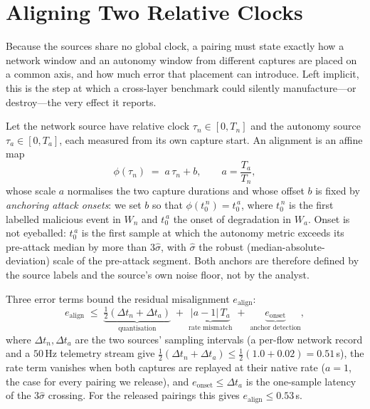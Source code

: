 \section{Aligning Two Relative Clocks}
\label{app:alignment}
Because the sources share no global clock, a  pairing
must state exactly how a network window and an autonomy window from different
captures are placed on a common axis, and how much error that placement can
introduce. Left implicit, this is the step at which a cross-layer benchmark
could silently manufacture---or destroy---the very effect it reports.

Let the network source have relative clock $\tau_n\in[0,T_n]$ and the autonomy
source $\tau_a\in[0,T_a]$, each measured from its own capture start. An
alignment is an affine map
\begin{equation}
\label{eq:align}
\phi(\tau_n) \;=\; a\,\tau_n + b, \qquad a=\frac{T_a}{T_n},
\end{equation}
whose scale $a$ normalises the two capture durations and whose offset $b$ is
fixed by \emph{anchoring attack onsets}: we set $b$ so that
$\phi(t_0^{\,n}) = t_0^{\,a}$, where $t_0^{\,n}$ is the first labelled malicious
event in $W_n$ and $t_0^{\,a}$ the onset of degradation in $W_a$. Onset is not
eyeballed: $t_0^{\,a}$ is the first sample at which the autonomy metric exceeds
its pre-attack median by more than $3\hat\sigma$, with $\hat\sigma$ the robust
(median-absolute-deviation) scale of the pre-attack segment. Both anchors are
therefore defined by the source labels and the source's own noise floor, not by
the analyst.

Three error terms bound the residual misalignment $e_{\mathrm{align}}$:
\begin{equation}
\label{eq:align_err}
e_{\mathrm{align}} \;\le\; \underbrace{\tfrac{1}{2}(\Delta t_n+\Delta t_a)}_{\text{quantisation}}
\;+\;\underbrace{|a-1|\,T_a}_{\text{rate mismatch}}
\;+\;\underbrace{e_{\mathrm{onset}}}_{\text{anchor detection}},
\end{equation}
where $\Delta t_n,\Delta t_a$ are the two sources' sampling intervals (a per-flow
network record and a $50$\,Hz telemetry stream give
$\tfrac12(\Delta t_n+\Delta t_a)\le\tfrac12(1.0+0.02)=0.51$\,s), the rate term
vanishes when both captures are replayed at their native rate ($a=1$, the case
for every pairing we release), and $e_{\mathrm{onset}}\le\Delta t_a$ is the
one-sample latency of the $3\hat\sigma$ crossing. For the released
 pairings this gives
$e_{\mathrm{align}}\le0.53$\,s.

